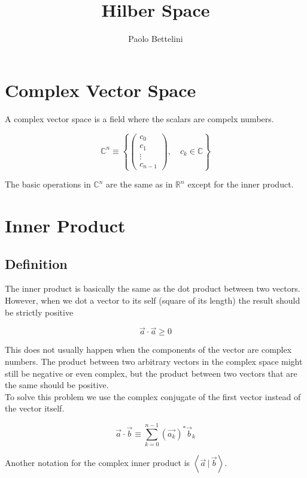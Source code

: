 \documentclass{article}
\title{Hilber Space}
\author{Paolo Bettelini}
\date{}
\newcommand{\braket}[1]{\left\langle#1\right\rangle}
\newcommand{\innerprod}[2]{\braket{#1\,|\,#2}}
\begin{document}
\maketitle
\tableofcontents
\pagebreak

\section{Complex Vector Space}

A complex vector space is a field where the scalars are compelx numbers.

\[
    \mathbb{C}^n \equiv
    \left\{
        \begin{pmatrix}
            c_0 \\
            c_1 \\
            \vdots \\
            c_{n-1}
        \end{pmatrix}
        ,\quad c_k \in \mathbb{C}
    \right\}
\]

The basic operations in \(\mathbb{C}^n\) are the same as in \(\mathbb{R}^n\) except for the inner product. 

\section{Inner Product}

\subsection{Definition}

The inner product is basically the same as the dot product between two vectors.
However, when we dot a vector to its self (square of its length) the result should be strictly positive

\[
    \vec{a} \cdot \vec{a} \geq 0
\]

This does not usually happen when the components of the vector are complex numbers.
The product between two arbitrary vectors in the complex space might still be negative or even complex,
but the product between two vectors that are the same should be positive.\\
To solve this problem we use the complex conjugate of the first vector instead of the vector itself.

\[
    \vec{a} \cdot \vec{b} \equiv \sum_{k=0}^{n-1} {(\vec{a_k})}^{*} \vec{b}_k
\]

Another notation for the complex inner product is \(\innerprod{\vec{a}}{\vec{b}}\).
\end{document}
